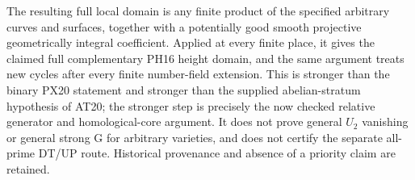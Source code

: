 The resulting full local domain is any finite product of the
specified arbitrary curves and surfaces, together with a
potentially good smooth projective geometrically integral
coefficient. Applied at every finite place, it gives the
claimed full complementary PH16 height domain, and the same
argument treats new cycles after every finite number-field
extension. This is stronger than the binary PX20 statement
and stronger than the supplied abelian-stratum hypothesis of
AT20; the stronger step is precisely the now checked relative
generator and homological-core argument. It does not prove
general $U_2$ vanishing or general strong G for arbitrary
varieties, and does not certify the separate all-prime DT/UP
route. Historical provenance and absence of a priority claim
are retained.
